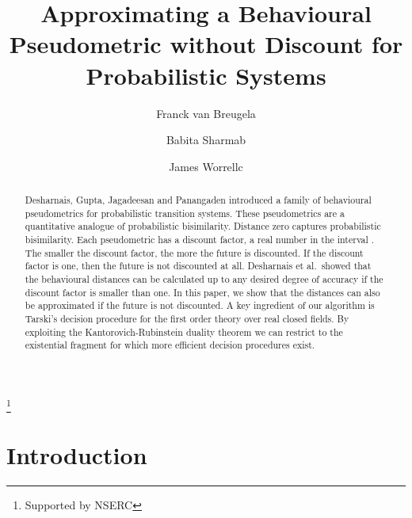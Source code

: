 \documentclass{LMCS}
\begin{document}
\title[Approximating a Behavioural Pseudometric]{Approximating a
Behavioural Pseudometric without Discount for Probabilistic
Systems\rsuper *}
\author[F.~van Breugel]{Franck van Breugel\rsuper a}
\address{{\lsuper a}York University,
         4700 Keele Street, Toronto, M3J 1P3, Canada}
\thanks{{}Supported by NSERC}
\author[B.~Sharma]{Babita Sharma\rsuper b}
\address{{\lsuper b}IBM Toronto Lab, 8200 Warden Avenue, Markham, L6G
1C7, Canada}
\author[J.~Worrell]{James Worrell\rsuper c}
\address{{\lsuper c}Oxford University Computing Laboratory,
         Parks Road, Oxford, OX1 3QD, England}

\begin{abstract}
\noindent
Desharnais, Gupta, Jagadeesan and Panangaden introduced a family of behavioural
pseudometrics for probabilistic transition systems.  These pseudometrics are a
quantitative analogue of probabilistic bisimilarity.  Distance zero captures
probabilistic bisimilarity.  Each pseudometric has a discount factor, a real 
number in the interval .  The smaller the discount factor, the more 
the future is discounted.  If the discount factor is one, then the future is 
not discounted at all.  Desharnais et al.\ showed that the behavioural 
distances can be calculated up to any desired degree of accuracy if the 
discount factor is smaller than one.  In this paper, we show that the 
distances can also be approximated if the future is not discounted.  A key 
ingredient of our algorithm is Tarski's decision procedure for the first order 
theory over real closed fields.  By exploiting the Kantorovich-Rubinstein 
duality theorem we can restrict to the existential fragment for which more 
efficient decision procedures exist.
\end{abstract}

\maketitle

\section{Introduction}
\end{document}
